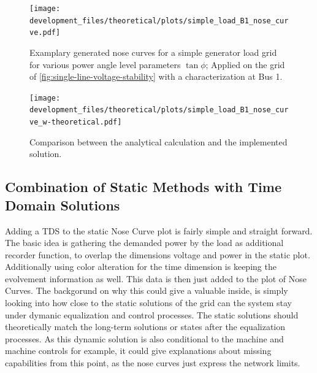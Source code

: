 \begin{figure}[htbp!]
        \centering
        \texttt{[image: development\_files/theoretical/plots/simple\_load\_B1\_nose\_curve.pdf]}
        \caption[Examplary generated nose curve for a simple generator - load grid]{Examplary generated nose curves for a simple generator load grid for various power angle level parameters $\tan \phi$; Applied on the grid of \autoref{fig:single-line-voltage-stability} with a characterization at Bus 1.}
        \label{fig:nose-curve-simple-grid}
\end{figure}

\begin{figure}[htbp!]
        \centering
        \texttt{[image: development\_files/theoretical/plots/simple\_load\_B1\_nose\_curve\_w-theoretical.pdf]}
        \caption[Comparison between the analytical calculation and the implemented solution]{Comparison between the analytical calculation and the implemented solution.}
        \label{fig:nose-curve-simple-comp}
\end{figure}


\subsection{Combination of Static Methods with Time Domain Solutions}
\label{sec:comb-time-dimension}

Adding a \acs{TDS} to the static Nose Curve plot is fairly simple and straight forward.
The basic idea is gathering the demanded power by the load as additional recorder function, to overlap the dimensions voltage and power in the static plot.
Additionally using color alteration for the time dimension is keeping the evolvement information as well.
This data is then just added to the plot of Nose Curves.
The backgorund on why this could give a valuable inside, is simply looking into how close to the static solutions of the grid can the system stay under dymanic equalization and control processes.
The static solutions should theoretically match the long-term solutions or states after the equalization processes.
As this dynamic solution is also conditional to the machine and machine controls for example, it could give explanations about missing capabilities from this point, as the nose curves just express the network limits.

